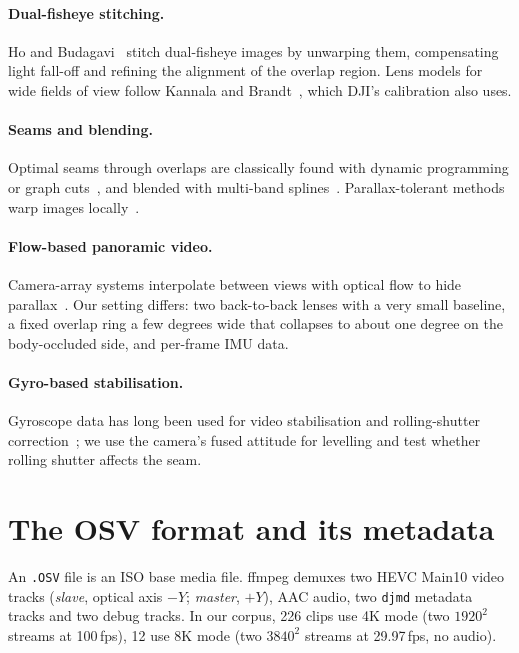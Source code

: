 \documentclass[11pt]{article}
\begin{document}
\paragraph{Dual-fisheye stitching.} Ho and Budagavi~\cite{ho2017dualfisheye} stitch dual-fisheye images by unwarping them, compensating light fall-off and refining the alignment of the overlap region. Lens models for wide fields of view follow Kannala and Brandt~\cite{kannala2006generic}, which DJI's calibration also uses.
\paragraph{Seams and blending.} Optimal seams through overlaps are classically found with dynamic programming or graph cuts~\cite{kwatra2003graphcut,agarwala2004photomontage}, and blended with multi-band splines~\cite{burt1983multiresolution}. Parallax-tolerant methods warp images locally~\cite{zaragoza2013apap,zhang2014parallax}.
\paragraph{Flow-based panoramic video.} Camera-array systems interpolate between views with optical flow to hide parallax~\cite{anderson2016jump,perazzi2015panoramic}. Our setting differs: two back-to-back lenses with a very small baseline, a fixed overlap ring a few degrees wide that collapses to about one degree on the body-occluded side, and per-frame IMU data.
\paragraph{Gyro-based stabilisation.} Gyroscope data has long been used for video stabilisation and rolling-shutter correction~\cite{karpenko2011gyro}; we use the camera's fused attitude for levelling and test whether rolling shutter affects the seam.

\section{The OSV format and its metadata}\label{sec:format}

An \texttt{.OSV} file is an ISO base media file. ffmpeg demuxes two HEVC Main10 video tracks (\emph{slave}, optical axis $-Y$; \emph{master}, $+Y$), AAC audio, two \texttt{djmd} metadata tracks and two debug tracks.
In our corpus, 226 clips use 4K mode (two $1920^2$ streams at 100\,fps), 12 use 8K mode (two $3840^2$ streams at 29.97\,fps, no audio).
\end{document}
